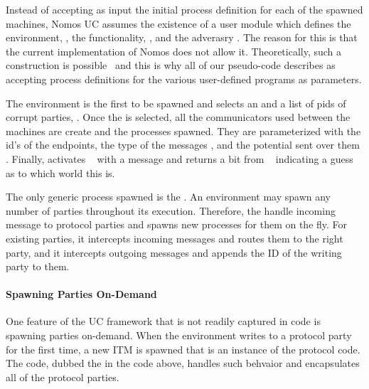 Instead of accepting as input the initial process definition for each of the spawned machines, Nomos UC assumes the existence of a user module  which defines the environment, , the functionality, , and the adverasry .
The reason for this is that the current implementation of Nomos does not allow it.
Theoretically, such a construction is possible~\cite{pfenning} and this is why all of our pseudo-code describes  as accepting process definitions for the various user-defined programs as parameters.

The environment is the first to be spawned and selects an  and a list of pids of corrupt parties, .
Once the  is selected, all the communicators used between the machines are create and the processes spawned.
They are parameterized with the id's of the endpoints, the type of the messages , and the potential sent over them .
Finally,  activates \Environment~ with a  message and returns a bit from \Environment~ indicating a guess as to which world this is.

The only generic process spawned is the .
An environment may spawn any number of parties throughout its execution.
Therefore, the  handle incoming message to protocol parties and spawns new processes for them on the fly.
For existing parties, it intercepts incoming messages and routes them to the right party, and it intercepts outgoing messages and appends the ID of the writing party to them. 


\paragraph{Spawning Parties On-Demand}
One feature of the UC framework that is not readily captured in code is spawning parties on-demand.
When the environment writes to a protocol party for the first time, a new ITM is spawned that is an instance of the protocol code.
The code, dubbed the  in the code above, handles such behvaior and encapsulates all of the protocol parties.

